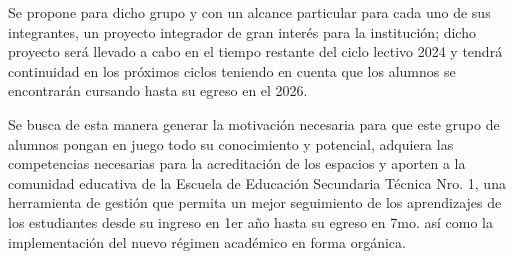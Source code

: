 Se propone para dicho grupo y con un alcance particular para cada uno de sus integrantes, un proyecto integrador de gran interés para la institución; dicho proyecto será llevado a cabo en el tiempo restante del ciclo lectivo 2024 y tendrá continuidad en los próximos ciclos teniendo en cuenta que los alumnos se encontrarán cursando hasta su egreso en el 2026.

Se busca de esta manera generar la motivación necesaria para que este grupo de alumnos pongan en juego todo su conocimiento y potencial, adquiera las competencias necesarias para la acreditación de los espacios y aporten a la comunidad educativa de la Escuela de Educación Secundaria Técnica Nro. 1, una herramienta de gestión que permita un mejor seguimiento de los aprendizajes de los estudiantes desde su ingreso en 1er año hasta su egreso en 7mo. así como la implementación del nuevo régimen académico en forma orgánica.
